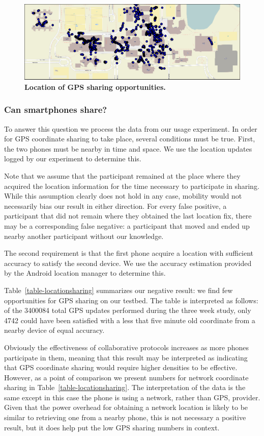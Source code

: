 \begin{figure}[t]
\includegraphics[width=\textwidth]{./figures/location/loc_sharing/map_gps_all.pdf}
\caption{\textbf{Location of GPS sharing opportunities.}}
\label{fig-locationsharing}
\end{figure}

\subsubsection{Can smartphones share?}

To answer this question we process the data from our usage experiment. In
order for GPS coordinate sharing to take place, several conditions must be
true. First, the two phones must be nearby in time and space. We use the
location updates logged by our experiment to determine this.

Note that we assume that the participant remained at the place where they
acquired the location information for the time necessary to participate in
sharing. While this assumption clearly does not hold in any case, mobility
would not necessarily bias our result in either direction. For every false
positive, a participant that did not remain where they obtained the last
location fix, there may be a corresponding false negative: a participant that
moved and ended up nearby another participant without our knowledge.

The second requirement is that the first phone acquire a location with
sufficient accuracy to satisfy the second device. We use the accuracy
estimation provided by the Android location manager to determine this.

Table~\ref{table-locationsharing} summarizes our negative result: we find few
opportunities for GPS sharing on our testbed. The table is interpreted as
follows: of the \num{3400084} total GPS updates performed during the three
week study, only \num{4742} could have been satisfied with a less that five
minute old coordinate from a nearby device of equal accuracy.

Obviously the effectiveness of collaborative protocols increases as more
phones participate in them, meaning that this result may be interpreted as
indicating that GPS coordinate sharing would require higher densities to be
effective. However, as a point of comparison we present numbers for network
coordinate sharing in Table~\ref{table-locationsharing}. The interpretation
of the data is the same except in this case the phone is using a network,
rather than GPS, provider. Given that the power overhead for obtaining a
network location is likely to be similar to retrieving one from a nearby
phone, this is not necessary a positive result, but it does help put the low
GPS sharing numbers in context.

